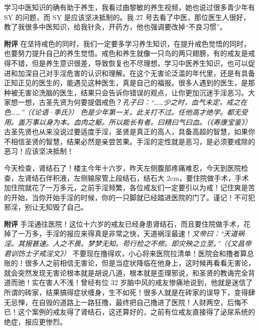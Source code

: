 \begin{case}
    学习中医知识的确有助于养生，我看过曲黎敏的养生视频，她也说过很多青少年有 SY 的问题，而 SY 是应该坚决抵制的。我 27 号去看了中医，那位医生人很好，教了我很多中医知识，给我针灸，开药方，他也强调要改掉“不良习惯”。

    \textbf{附评} 在坚持戒色的同时，我们一定要多学习养生知识，在提升戒色觉悟的同时，也要努力提升自己的养生觉悟。戒色和养生就像一只鸟的两只翅膀，有的戒友是戒得不错，但是养生意识很差，导致恢复也不尽理想。学习中医养生知识，也可以促进和加深自己对手淫危害的认识和理解。在这个无害论泛滥的年代里，还是有具备正知正见的医生的，能遇见这种医生，真是自己的福报。很多人遇到的医生，是那种被无害论洗脑的医生，结果只会告诉你错误的观点，让你更加沉迷手淫恶习。大家想一想，古圣先贤为何要提倡戒色？\textit{孔子曰：“……少之时，血气未定，戒之在色……”（《论语·季氏》）} \textit{色是少年第一关。此关打不过。任他高才绝学。都无受用。盖万事以身为本。血肉之躯。所以能长有者。曰精曰气曰血。（《寿康宝鉴》）} 古圣先贤也从来没说过要适度手淫，圣贤是真正的高人，具备高超的智慧，如果你不相信圣贤的智慧，结果必然是亲尝苦果。手淫的定性就是恶习，是必须要戒除的恶习！应该坚决抵制！
\end{case}

\begin{case}
    今天检查，肾结石了！楼主今年十六岁，昨天左侧腹部疼痛难忍，今天到医院检查，左肾结石伴积液，左侧输尿管上段结石，结石大 $2 \unit{\cm}$，要住院做手术，手术加住院就花了一万多元，之前手淫频繁，各位戒友们一定要引以为戒！记住爽是苦的开始，当你开始手淫的时候，你的一只脚就已经踏进医院的门了。谨记！不可犯邪淫，别让无知毁了自己。

    \textbf{附评} 手淫通往医院！这位十六岁的戒友已经身患肾结石，而且要住院做手术，花掉了一万多，手淫的报应来得真是非常之快，天道祸淫最速！\textit{文帝曰：“天道祸淫。其报甚速。人之不畏。梦梦无知。苟行检之不修。即灾殃之立至。”（《文昌帝君训饬士子戒淫文》）} 不要现在撸得欢，小心将来医院拉清单！医院会和撸者算总账的！很多人之前相信无害论，但是当症状降临在他身上，这时候再看看无害论，就会突然发现无害论根本就是胡说八道，根本就是歪理邪说，和圣贤的教诲完全背道而驰！实在害人不浅！曾经有位 32 岁脑中风的戒友惨痛地说到，他就是迷信了所谓的砖家，结果搞得症状缠身，生不如死！很多人就是在砖家的误导下，变得肆无忌惮，在自毁的道路上一路狂撸，最终把自己撸进了医院！人财两空，后悔不已！这个案例的戒友得了肾结石，这还算好的，之前有位戒友直接得了泌尿系统的绝症，报应更惨烈。
\end{case}

